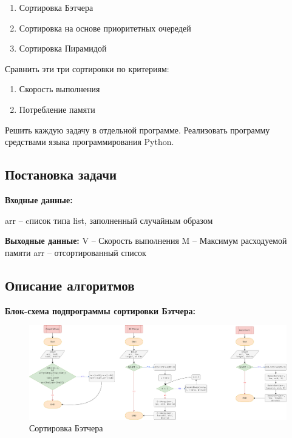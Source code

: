 \begin{enumerate}
    \item Сортировка Бэтчера
    \item Сортировка на основе приоритетных очередей
    \item Сортировка Пирамидой
\end{enumerate}

Сравнить эти три сортировки по критериям:

\begin{enumerate}
    \item Скорость выполнения
    \item Потребление памяти
\end{enumerate}

Решить каждую задачу в отдельной программе. Реализовать программу средствами языка программирования Python.

\subsection{Постановка задачи}

\textbf{Входные данные:}

arr – cписок типа list, заполненный случайным образом

\textbf{Выходные данные:}
V – Скорость выполнения
M – Максимум расходуемой памяти
arr – отсортированный список


\subsection{Описание алгоритмов}

\textbf{Блок-схема подпрограммы сортировки Бэтчера:}



\begin{figure}[H]
    \centering
    \includegraphics[width=1\textwidth]{./flowcharts/barcher.drawio.png}
    \caption{Сортировка Бэтчера}
\end{figure}


